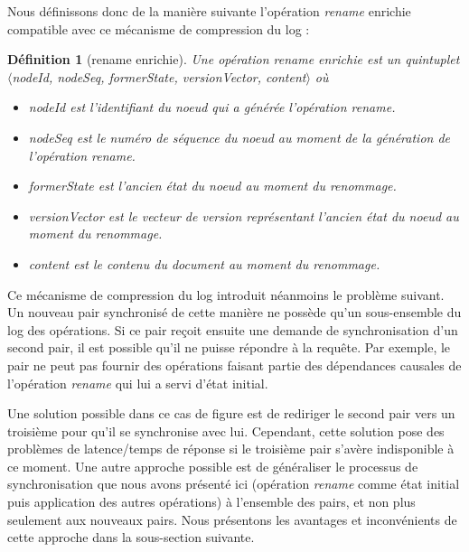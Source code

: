 \documentclass[12pt]{thesul}
\newtheorem{definition}{Définition}
\begin{document}
Nous définissons donc de la manière suivante l'opération \emph{rename} enrichie compatible avec ce mécanisme de compression du log :

\begin{definition}[rename enrichie]
  \label{def:-rich-rename-op}
  Une opération \emph{rename enrichie} est un quintuplet $\langle$nodeId, nodeSeq, formerState, versionVector, content$\rangle$ où
  \begin{itemize}
    \item nodeId est l'identifiant du noeud qui a générée l'opération \emph{rename}.
    \item nodeSeq est le numéro de séquence du noeud au moment de la génération de l'opération \emph{rename}.
    \item formerState est l'ancien état du noeud au moment du renommage.
    \item versionVector est le vecteur de version représentant l'ancien état du noeud au moment du renommage.
    \item content est le contenu du document au moment du renommage.
  \end{itemize}
\end{definition}

Ce mécanisme de compression du log introduit néanmoins le problème suivant.
Un nouveau pair synchronisé de cette manière ne possède qu'un sous-ensemble du log des opérations.
Si ce pair reçoit ensuite une demande de synchronisation d'un second pair, il est possible qu'il ne puisse répondre à la requête.
Par exemple, le pair ne peut pas fournir des opérations faisant partie des dépendances causales de l'opération \emph{rename} qui lui a servi d'état initial.

Une solution possible dans ce cas de figure est de rediriger le second pair vers un troisième pour qu'il se synchronise avec lui.
Cependant, cette solution pose des problèmes de latence/temps de réponse si le troisième pair s'avère indisponible à ce moment.
Une autre approche possible est de généraliser le processus de synchronisation que nous avons présenté ici (opération \emph{rename} comme état initial puis application des autres opérations) à l'ensemble des pairs, et non plus seulement aux nouveaux pairs.
Nous présentons les avantages et inconvénients de cette approche dans la sous-section suivante.

\end{document}
